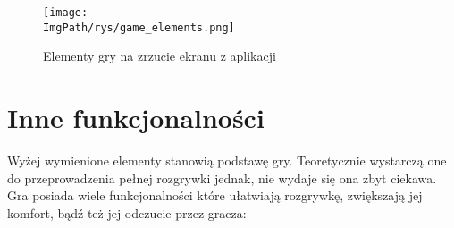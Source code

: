 \documentclass[a4paper,12pt,twoside,openany]{report}
\newcommand{\ImgPath}{.}
\begin{document}
\begin{figure}[!htbp]
	\begin{center}
\centering
\texttt{[image: \\ImgPath/rys/game\_elements.png]}
\end{center}
	\caption{Elementy gry na zrzucie ekranu z aplikacji}
	\label{game_elements}
\end{figure}

\section{Inne funkcjonalności}
Wyżej wymienione elementy stanowią podstawę gry. Teoretycznie wystarczą one do przeprowadzenia pełnej rozgrywki jednak, nie wydaje się ona zbyt ciekawa. Gra posiada wiele funkcjonalności które ułatwiają rozgrywkę, zwiększają jej komfort, bądź też jej odczucie przez gracza:
\end{document}

